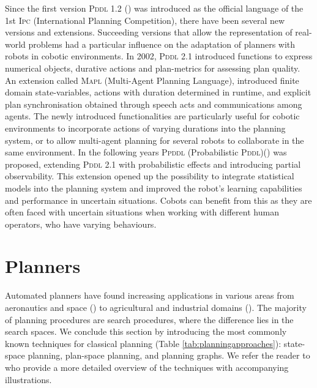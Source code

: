 Since the first version \textsc{Pddl} 1.2 (\cite{mcdermott1998pddl}) was introduced as the official language of the 1st \textsc{Ipc} (International Planning Competition), there have been several new versions and extensions.
Succeeding versions that allow the representation of real-world problems had a particular influence on the adaptation of planners with robots in cobotic environments. 
In 2002, \textsc{Pddl} 2.1 introduced functions to express numerical objects, durative actions and plan-metrics for assessing plan quality.
An extension called \textsc{Mapl} (Multi-Agent Planning Language), introduced finite domain state-variables, actions with duration determined in runtime, and explicit plan synchronisation obtained through speech acts and communications among agents. 
The newly introduced functionalities are particularly useful for cobotic environments to incorporate actions of varying durations into the planning system, or to allow multi-agent planning for several robots to collaborate in the same environment.
In the following years \textsc{Ppddl} (Probabilistic \textsc{Pddl})(\cite{younes:04a}) was proposed, extending \textsc{Pddl} 2.1 with probabilistic effects and introducing partial observability. 
This extension opened up the possibility to integrate statistical models into the planning system and improved the robot's learning capabilities and performance in uncertain situations. 
Cobots can benefit from this as they are often faced with uncertain situations when working with different human operators, who have varying behaviours.

\section{Planners}\label{subsec:Planners}
Automated planners have found increasing applications in various areas from aeronautics and space (\cite{aarup1992optimum}) to agricultural and industrial domains (\cite{aggriculture}). 
The majority of planning procedures are search procedures, where the difference lies in the search spaces.
We conclude this section by introducing the most commonly known techniques for classical planning (Table \ref{tab:planningapproaches}):
state-space planning, plan-space planning, and planning graphs. 
We refer the reader to \cite{nau2007current} who provide a more detailed overview of the techniques with accompanying illustrations.

